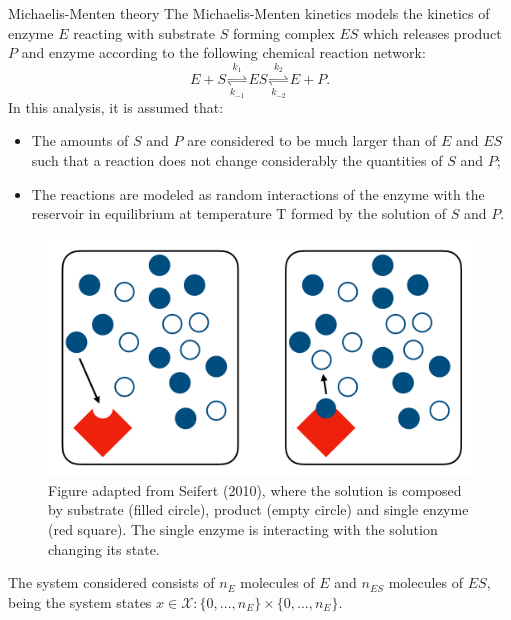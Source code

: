 \documentclass[final]{beamer}
\newlength{\colwidth}
\begin{document}
\begin{frame}[t]
\begin{columns}[t]
\begin{column}{\colwidth}
\begin{block}{Michaelis-Menten theory}
The Michaelis-Menten kinetics models the kinetics of enzyme $E$ reacting with substrate $S$ forming complex $ES$ which releases product $P$ and enzyme according to the following chemical reaction network: 
\begin{equation*}
E + S \underset{k_{-1}}{\stackrel{k_1}{\rightleftharpoons}} ES \underset{k_{-2}}{\stackrel{k_2}{\rightleftharpoons}} E + P.
\end{equation*}
%
In this analysis, it is assumed that:
\begin{itemize}
\justifying
\item The amounts of $S$ and $P$ are considered to be much larger than of $E$ and $ES$ such that a reaction does not change considerably the quantities of $S$ and $P$;
\item The reactions are modeled as random interactions of the enzyme with the reservoir in equilibrium at temperature T formed by the solution of $S$ and $P$\cite{Seifert:2010aa}.
\end{itemize}
%
\begin{figure}
\centering
\includegraphics[width=.8\textwidth]{graphics/MichaelisMenten.pdf}
\caption{\justifying Figure adapted from Seifert (2010)\cite{Seifert:2010aa}, where the solution is composed by substrate (filled circle), product (empty circle) and single enzyme (red square). The single enzyme is interacting with the solution changing its state.}
\vskip-20pt
\end{figure}
%
The system considered consists of $n_E$ molecules of $E$ and $n_{ES}$ molecules of $ES$, being the system states $x \in \mathcal{X} : \{0,...,n_E\}\times \{0,...,n_E\}$.


\end{block}
\end{column}
\end{columns}
\end{frame}
\end{document}
